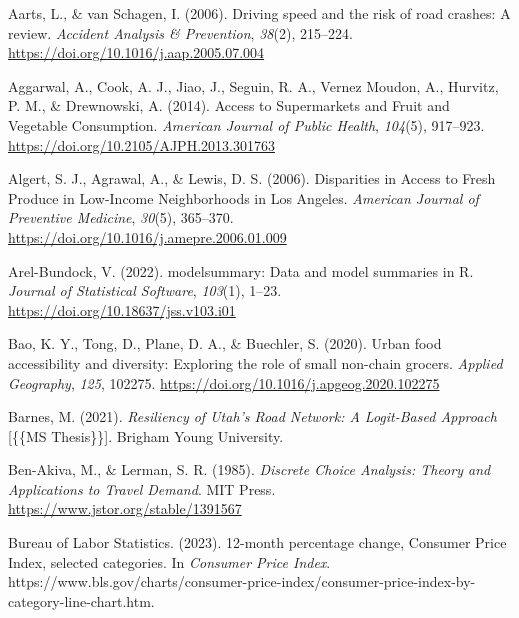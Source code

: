 \documentclass[
  letterpaper,
  authoryear,
  review,
  3p]{elsarticle}
\newlength{\cslhangindent}
\newlength{\cslentryspacingunit} %
\newenvironment{CSLReferences}[2] %
 {%
  \setlength{\parindent}{0pt}
  \ifodd #1
  \let\oldpar\par
  \def\par{\hangindent=\cslhangindent\oldpar}
  \fi
  \setlength{\parskip}{#2\cslentryspacingunit}
 }%
 {}
\begin{document}

\hypertarget{refs}{}
\begin{CSLReferences}{1}{0}
\leavevmode{}%
Aarts, L., \& van Schagen, I. (2006). Driving speed and the risk of road
crashes: {A} review. \emph{Accident Analysis \& Prevention},
\emph{38}(2), 215--224. \url{https://doi.org/10.1016/j.aap.2005.07.004}

\leavevmode{}%
Aggarwal, A., Cook, A. J., Jiao, J., Seguin, R. A., Vernez Moudon, A.,
Hurvitz, P. M., \& Drewnowski, A. (2014). Access to {Supermarkets} and
{Fruit} and {Vegetable Consumption}. \emph{American Journal of Public
Health}, \emph{104}(5), 917--923.
\url{https://doi.org/10.2105/AJPH.2013.301763}

\leavevmode{}%
Algert, S. J., Agrawal, A., \& Lewis, D. S. (2006). Disparities in
{Access} to {Fresh Produce} in {Low-Income Neighborhoods} in {Los
Angeles}. \emph{American Journal of Preventive Medicine}, \emph{30}(5),
365--370. \url{https://doi.org/10.1016/j.amepre.2006.01.009}

\leavevmode{}%
Arel-Bundock, V. (2022). {modelsummary}: Data and model summaries in
{R}. \emph{Journal of Statistical Software}, \emph{103}(1), 1--23.
\url{https://doi.org/10.18637/jss.v103.i01}

\leavevmode{}%
Bao, K. Y., Tong, D., Plane, D. A., \& Buechler, S. (2020). Urban food
accessibility and diversity: {Exploring} the role of small non-chain
grocers. \emph{Applied Geography}, \emph{125}, 102275.
\url{https://doi.org/10.1016/j.apgeog.2020.102275}

\leavevmode{}%
Barnes, M. (2021). \emph{Resiliency of {Utah}'s {Road Network}: {A
Logit-Based Approach}} {[}\{\{MS Thesis\}\}{]}. Brigham Young
University.

\leavevmode{}%
Ben-Akiva, M., \& Lerman, S. R. (1985). \emph{Discrete {Choice
Analysis}: {Theory} and {Applications} to {Travel Demand}}. {MIT Press}.
\url{https://www.jstor.org/stable/1391567}

\leavevmode{}%
Bureau of Labor Statistics. (2023). 12-month percentage change,
{Consumer Price Index}, selected categories. In \emph{Consumer Price
Index}.
https://www.bls.gov/charts/consumer-price-index/consumer-price-index-by-category-line-chart.htm.


\end{CSLReferences}
\end{document}
